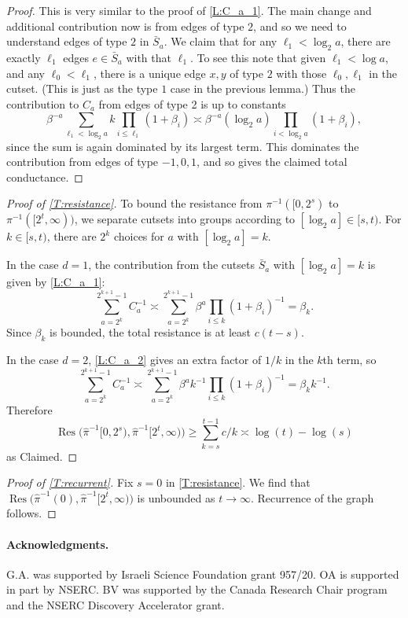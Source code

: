 \documentclass[12pt]{article}
\theoremstyle{definition}
\numberwithin{equation}{section}
\renewcommand{\hat}{\widehat}
\newcommand{\Res}{\operatorname{Res}}
\begin{document}
\begin{proof}
  This is very similar to the proof of \cref{L:C_a_1}.
  The main change and additional contribution now is from edges of type $2$, and so we need to understand edges of type $2$ in $\bar S_a$.
  We claim that for any $\ell_1 < \log_2 a$, there are exactly $\ell_1$ edges $e\in\bar S_a$ with that $\ell_1$.
  To see this note that given $\ell_1 <
  \log a$, and any $\ell_0<\ell_1$, there is a unique edge $x,y$ of type $2$ with those $\ell_0,\ell_1$ in the cutset.
  (This is just as the type $1$ case in the previous lemma.)
  Thus the contribution to $C_a$ from edges of type 2 is up to constants
  \[
    \beta^{-a} \sum_{\ell_1 < \log_2 a} k \prod_{i\leq \ell_1} (1+\beta_i)
    \asymp \beta^{-a} (\log_2 a) \prod_{i < \log_2 a} (1+\beta_i),
  \]
  since the sum is again dominated by its largest term.
  This dominates the contribution from edges of type $-1,0,1$, and so gives the claimed total conductance.
\end{proof}

\begin{proof}[Proof of \cref{T:resistance}]
  To bound the resistance from $\pi^{-1}([0,2^s)$ to   $\pi^{-1}([2^t,\infty))$, we separate cutsets into groups according to   $[\log_2 a] \in [s,t)$.
  For $k\in[s,t)$, there are $2^k$ choices for $a$ with $[\log_2 a]=k$.

  In the case $d=1$,
  the contribution from the cutsets $\bar S_a$ with $[\log_2 a] = k$ is given by \cref{L:C_a_1}:
  \[
    \sum_{a=2^k}^{2^{k+1}-1} C_a^{-1}
    \asymp
    \sum_{a=2^k}^{2^{k+1}-1} \beta^a \prod_{i\leq k}
    (1+\beta_i)^{-1} = \beta_k.
  \]
  Since $\beta_k$ is bounded, the total resistance is at least $c(t-s)$.

  In the case $d=2$, \cref{L:C_a_2} gives an extra factor of $1/k$ in the $k$th term, so
  \[
    \sum_{a=2^k}^{2^{k+1}-1} C_a^{-1} \asymp
    \sum_{a=2^k}^{2^{k+1}-1} \beta^a k^{-1} \prod_{i\leq k}
    (1+\beta_i)^{-1} = \beta_k k^{-1}.
  \]
  Therefore
  \[
    \Res\big(\hat\pi^{-1}[0,2^s), \hat\pi^{-1}[2^t,\infty)\big) \geq
    \sum_{k=s}^{t-1} c/k
    \asymp \log(t)-\log(s)
  \]
  as Claimed.
\end{proof}

\begin{proof}[Proof of \cref{T:recurrent}]
  Fix $s=0$ in \cref{T:resistance}.
  We find that $\Res\big(\hat\pi^{-1}(0), \hat\pi^{-1}[2^t,\infty)\big)$ is unbounded as $t\to\infty$.
  Recurrence of the graph follows.
\end{proof}

\paragraph{Acknowledgments.}
G.A. was supported by Israeli Science Foundation grant 957/20.
OA is supported in part by NSERC.
BV was supported by the Canada Research Chair program and the NSERC Discovery Accelerator grant.


\end{document}
